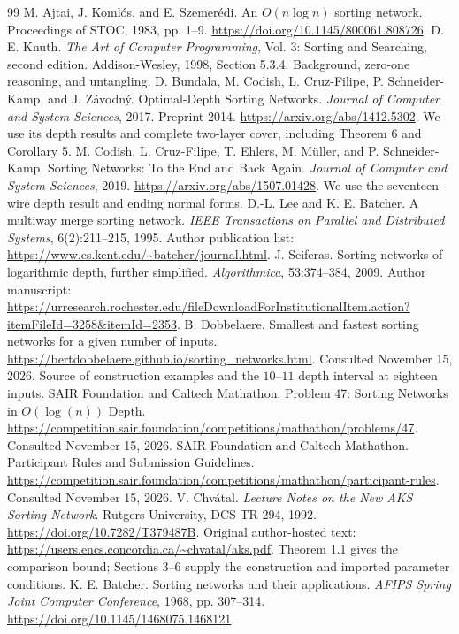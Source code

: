\documentclass[11pt]{article}
\begin{document}
\begin{thebibliography}{99}
 M. Ajtai, J. Koml\'os, and E. Szemer\'edi. An $O(n\log n)$ sorting network. Proceedings of STOC, 1983, pp. 1--9. \url{https://doi.org/10.1145/800061.808726}.
 D. E. Knuth. \emph{The Art of Computer Programming}, Vol. 3: Sorting and Searching, second edition. Addison-Wesley, 1998, Section 5.3.4. Background, zero-one reasoning, and untangling.
 D. Bundala, M. Codish, L. Cruz-Filipe, P. Schneider-Kamp, and J. Z\'avodn\'y. Optimal-Depth Sorting Networks. \emph{Journal of Computer and System Sciences}, 2017. Preprint 2014. \url{https://arxiv.org/abs/1412.5302}. We use its depth results and complete two-layer cover, including Theorem 6 and Corollary 5.
 M. Codish, L. Cruz-Filipe, T. Ehlers, M. M\"uller, and P. Schneider-Kamp. Sorting Networks: To the End and Back Again. \emph{Journal of Computer and System Sciences}, 2019. \url{https://arxiv.org/abs/1507.01428}. We use the seventeen-wire depth result and ending normal forms.
 D.-L. Lee and K. E. Batcher. A multiway merge sorting network. \emph{IEEE Transactions on Parallel and Distributed Systems}, 6(2):211--215, 1995. Author publication list: \url{https://www.cs.kent.edu/~batcher/journal.html}.
 J. Seiferas. Sorting networks of logarithmic depth, further simplified. \emph{Algorithmica}, 53:374--384, 2009. Author manuscript: \url{https://urresearch.rochester.edu/fileDownloadForInstitutionalItem.action?itemFileId=3258&itemId=2353}.
 B. Dobbelaere. Smallest and fastest sorting networks for a given number of inputs. \url{https://bertdobbelaere.github.io/sorting_networks.html}. Consulted November 15, 2026. Source of construction examples and the $10$--$11$ depth interval at eighteen inputs.
 SAIR Foundation and Caltech Mathathon. Problem 47: Sorting Networks in $O(\log(n))$ Depth. \url{https://competition.sair.foundation/competitions/mathathon/problems/47}. Consulted November 15, 2026.
 SAIR Foundation and Caltech Mathathon. Participant Rules and Submission Guidelines. \url{https://competition.sair.foundation/competitions/mathathon/participant-rules}. Consulted November 15, 2026.
 V. Chv\'atal. \emph{Lecture Notes on the New AKS Sorting Network}. Rutgers University, DCS-TR-294, 1992. \url{https://doi.org/10.7282/T379487B}. Original author-hosted text: \url{https://users.encs.concordia.ca/~chvatal/aks.pdf}. Theorem 1.1 gives the comparison bound; Sections 3--6 supply the construction and imported parameter conditions.
 K. E. Batcher. Sorting networks and their applications. \emph{AFIPS Spring Joint Computer Conference}, 1968, pp. 307--314. \url{https://doi.org/10.1145/1468075.1468121}.
\end{thebibliography}
\end{document}

